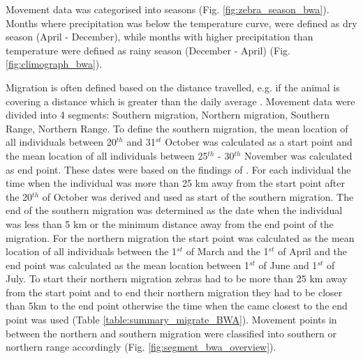 \documentclass[12pt,a4paper, twoside, english]{article}
\begin{document}

Movement data was categorised into seasons (Fig. \ref{fig:zebra_season_bwa}). Months where precipitation was below the temperature curve, were defined as dry season (April - December), while months with higher precipitation than temperature were defined as rainy season (December - April) (Fig. \ref{fig:climograph_bwa}).


Migration is often defined based on the distance travelled, e.g. if the animal is covering a distance which is greater than the daily average \citep{Cagnacci2016}. Movement data were divided into 4 segments: Southern migration, Northern migration, Southern Range, Northern Range. To define the southern migration, the mean location of all individuals between 20$^{th}$ and 31$^{st}$ October was calculated as a start point and the mean location of all individuals between 25$^{th}$ - 30$^{th}$ November was calculated as end point. These dates were based on the findings of \cite{Bartlam-Brooks2013}. For each individual the time when the individual was more than 25 km away from the start point after the 20$^{th}$ of October was derived and used as start of the southern migration. The end of the southern migration was determined as the date when the individual was less than 5 km or the minimum distance away from the end point of the migration. For the northern migration the start point was calculated as the mean location of all individuals between the 1$^{st}$ of March and the 1$^{st}$ of April and the end point was calculated as the mean location between 1$^{st}$ of June and 1$^{st}$ of July. To start their northern migration zebras had to be more than 25 km away from the start point and to end their northern migration they had to be closer than 5km to the end point otherwise the time when the came closest to the end point was used (Table \ref{table:summary_migrate_BWA}). Movement points in between the northern and southern migration were classified into southern or northern range accordingly (Fig. \ref{fig:segment_bwa_overview}).
\end{document}
